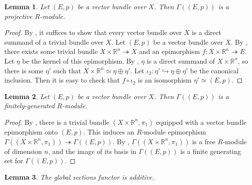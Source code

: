 \documentclass[11pt]{article}
\newcommand{\R}{\mathbb{R}}
\theoremstyle{plain}
\newtheorem{lemma}{Lemma}[section]
\theoremstyle{definition}
\begin{document}

\begin{lemma}
  \label{lemma:global-sections-projective}
  Let \((E,p)\) be a vector bundle over \(X\). Then \(\Gamma((E,p))\) is a projective \(R\)-module.
\end{lemma}

\begin{proof}
  By , it suffices to show that every vector bundle over \(X\) is a direct summand of a trivial bundle over \(X\). Let \((E,p)\) be a vector bundle over \(X\). By , there exists some trivial bundle \(X \times \R^n \twoheadrightarrow X\) and an epimorphism \(f : X \times \R^n \twoheadrightarrow E\). Let \(\eta\) be the kernel of this epimorphism. By , \(\eta\) is a direct summand of \(X \times \R^n\), so there is some \(\eta'\) such that \(X \times \R^n \simeq \eta \oplus \eta'\). Let \(\iota_2 : \eta' \hookrightarrow \eta \oplus \eta'\) be the canonical inclusion. Then it is easy to check that \(f \circ \iota_2\) is an isomorphism \(\eta' \simeq (E,p)\).
\end{proof}

\begin{lemma}\label{lemma:global-sections-fg}
  Let \((E,p)\) be a vector bundle over \(X\). Then \(\Gamma((E,p))\) is a finitely-generated \(R\)-module.
\end{lemma}

\begin{proof}
  By , there is a trivial bundle \((X \times \R^n, \pi_1)\) equipped with a vector bundle epimorphism onto \((E,p)\). This induces an \(R\)-module epimorphism \(\Gamma((X \times \R^n, \pi_1)) \twoheadrightarrow \Gamma((E,p))\). By , \(\Gamma((X \times \R^n, \pi_1))\) is a free \(R\)-module of dimension \(n\), and the image of its basis in \(\Gamma((E,p))\) is a finite generating set for \(\Gamma((E,p))\).
\end{proof}

\begin{lemma}\label{lemma:global-sections-additive}
  The global sections functor is additive.
\end{lemma}
\end{document}
